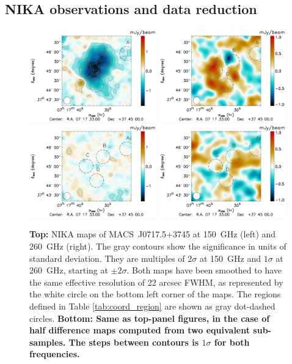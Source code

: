 \documentclass[twocolumn,traditabstract]{aa}
\begin{document}
\subsection{NIKA observations and data reduction}\label{sec:NIKA_observations_and_data_reduction}
\begin{figure}[h]
\centering
\includegraphics[width=0.49\textwidth]{Figure/MACSJ0717_2mm_map.pdf}
\includegraphics[width=0.49\textwidth]{Figure/MACSJ0717_1mm_map.pdf}
\includegraphics[width=0.49\textwidth]{Figure/MACSJ0717_JK_2mm_map.pdf}
\includegraphics[width=0.49\textwidth]{Figure/MACSJ0717_JK_1mm_map.pdf}
\caption{\footnotesize{{\bf Top:} NIKA maps of \mbox{MACS~J0717.5+3745} at 150~GHz (left) and 260~GHz (right). The gray contours show the significance in units of standard deviation. They are multiples of $2 \sigma$ at 150~GHz and $1 \sigma$ at 260~GHz, starting at $\pm 2 \sigma$. Both maps have been smoothed to have the same effective resolution of 22 arcsec FWHM, as represented by the white circle on the bottom left corner of the maps. The regions defined in Table \ref{tab:coord_region} are shown as gray dot-dashed circles. {\bf {\bf Bottom:} Same as top-panel figures, in the case of half difference maps computed from two equivalent sub-samples. The steps between contours is $1 \sigma$ for both frequencies.}}}
\label{fig:NIKA_raw_maps}
\end{figure}
\end{document}

